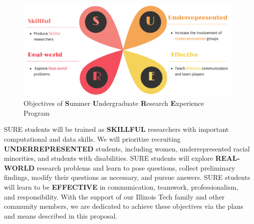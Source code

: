 \documentclass[11pt]{NSFamsart}
\begin{document}
\begin{figure}[bh]
    \centering
    \includegraphics[width = 14cm]{SURE_1_3.png}
    \caption{Objectives of {\bf S}ummer {\bf U}ndergraduate {\bf R}esearch {\bf E}xperience Program}
    \label{fig:sure_obj}
\end{figure}

SURE students will be trained as \uppercase{\textbf{skillful}} researchers with important computational and data skills. 
We will prioritize recruiting \uppercase{\textbf{underrepresented}} students, including women, underrepresented racial minorities, and students with disabilities. 
SURE students will explore 
\uppercase{\textbf{Real-world}} research problems and learn to pose questions, collect preliminary findings, modify their questions as necessary, and pursue answers. 
SURE students will learn to 
be \uppercase{\textbf{effective}} in communication, teamwork,  professionalism, and responsibility. 
With the support of our Illinois Tech family and other community members, we are dedicated to achieve these objectives via the plans and means described in this proposal. 

\end{document}
